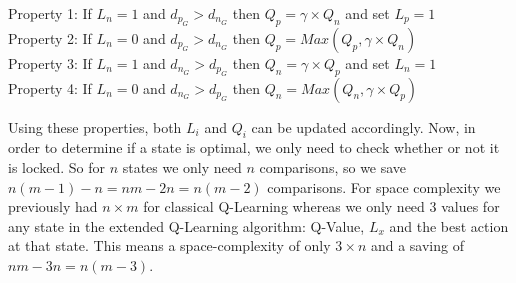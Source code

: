 \vspace{1\baselineskip}\vspace{-\parskip}

\begin{flushleft}
Property 1: If $L_n=1$ and $d_p_G > d_n_G$ then $Q_p = \gamma \times Q_n$ and set $L_p=1$\\
Property 2: If $L_n=0$ and $d_p_G > d_n_G$ then $Q_p = Max(Q_p,\gamma \times Q_n)$\\
Property 3: If $L_n=1$ and $d_n_G > d_p_G$ then $Q_n = \gamma \times Q_p$ and set $L_n=1$\\
Property 4: If $L_n=0$ and $d_n_G > d_p_G$ then $Q_n = Max(Q_n,\gamma \times Q_p)$\\
\end{flushleft}

\vspace{1\baselineskip}\vspace{-\parskip}

Using these properties, both $L_i$ and $Q_i$ can be updated accordingly. Now, in order to determine if a state is optimal, we only need to check whether or not it is locked. So for $n$ states we only need $n$ comparisons, so we save $n(m-1)-n=nm-2n=n(m-2)$ \cite{11} comparisons.
For space complexity we previously had $n \times m $ for classical Q-Learning whereas we only need $3$ values for any state in the extended Q-Learning algorithm: Q-Value, $L_x$ and the best action at that state. This means a space-complexity of only $3 \times n$ and a saving of $nm-3n=n(m-3)$.\cite{11}






